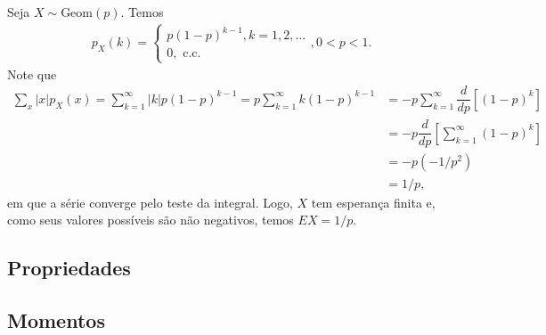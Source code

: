 \documentclass[../Notas.tex]{subfiles}
\begin{document}
\begin{example}
Seja $X\sim\text{Geom}(p)$. Temos
\begin{align*}
    p_X(k) = \begin{cases}
    p(1-p)^{k-1}, k = 1,2,\dots \\
    0, \text{ c.c.}
    \end{cases}, 0 < p < 1.
\end{align*}
Note que
\begin{align*}
    \sum_x |x|p_X(x) = \sum_{k=1}^{\infty} |k|p(1-p)^{k-1} = p\sum_{k=1}^{\infty} k(1-p)^{k-1} &= -p\sum_{k=1}^{\infty} \dfrac{d}{dp}[(1-p)^k] \\
    &= -p\dfrac{d}{dp}\left[ \sum_{k=1}^{\infty} (1-p)^k \right] \\
    &= -p(-1/p^2) \\
    &= 1/p,
\end{align*}
em que a série converge pelo teste da integral. Logo, $X$ tem esperança finita e, como seus valores possíveis são não negativos, temos $EX=1/p$.
\end{example}

\begin{example}

\end{example}



\subsection{Propriedades}



\subsection{Momentos}
\end{document}
